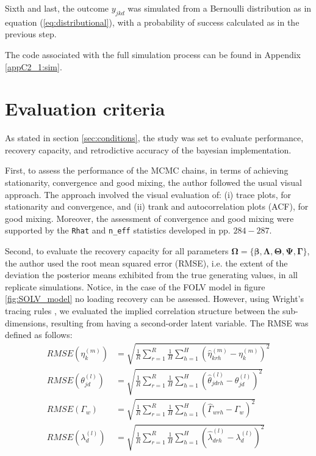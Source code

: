 Sixth and last, the outcome $y_{jkd}$ was simulated from a Bernoulli distribution as in equation (\ref{eq:distributional}), with a probability of success calculated as in the previous step.

The code associated with the full simulation process can be found in Appendix \ref{appC2_1:sim}.


\section{Evaluation criteria}

As stated in section \ref{sec:conditions}, the study was set to evaluate performance, recovery capacity, and retrodictive accuracy of the bayesian implementation.

First, to assess the performance of the MCMC chains, in terms of achieving stationarity, convergence and good mixing, the author followed the usual visual approach. The approach involved the visual evaluation of: (i) trace plots, for stationarity and convergence, and (ii) trank and autocorrelation plots (ACF), for good mixing. Moreover, the assessment of convergence and good mixing were supported by the \texttt{Rhat} and \texttt{n\_eff} statistics developed in \citet{Gelman_et_al_2014} pp. $284-287$.

Second, to evaluate the recovery capacity for all parameters $\pmb{\Omega} = \{ \pmb{\beta}, \pmb{\Lambda}, \pmb{\Theta}, \pmb{\Psi}, \pmb{\Gamma} \}$, the author used the root mean squared error (RMSE), i.e. the extent of the deviation the posterior means exhibited from the true generating values, in all replicate simulations. Notice, in the case of the FOLV model in figure \ref{fig:SOLV_model} no loading recovery can be assessed. However, using Wright's tracing rules \cite{Beaujean_2014}, we evaluated the implied correlation structure between the sub-dimensions, resulting from having a second-order latent variable. The RMSE was defined as follows:
%
\begin{align}
	RMSE \left( \eta^{(m)}_{k} \right) &=\sqrt{\frac{1}{R} \sum_{r=1}^{R} \frac{1}{H} \sum_{h=1}^{H} \left( \hat{\eta}^{(m)}_{krh} - \eta^{(m)}_{k} \right)^2} \\
	RMSE \left( \theta^{(l)}_{jd} \right) &=\sqrt{\frac{1}{R} \sum_{r=1}^{R} \frac{1}{H} \sum_{h=1}^{H} \left( \hat{\theta}^{(l)}_{jdrh} - \theta^{(l)}_{jd} \right)^2} \\
	RMSE \left( \Gamma_{w} \right) &=\sqrt{\frac{1}{R} \sum_{r=1}^{R} \frac{1}{H} \sum_{h=1}^{H} \left( \hat{\Gamma}_{wrh} - \Gamma_{w} \right)^2} \\
	RMSE \left( \lambda^{(l)}_{d} \right) &=\sqrt{\frac{1}{R} \sum_{r=1}^{R} \frac{1}{H} \sum_{h=1}^{H} \left( \hat{\lambda}^{(l)}_{drh} - \lambda^{(l)}_{d} \right)^2}
\end{align}

